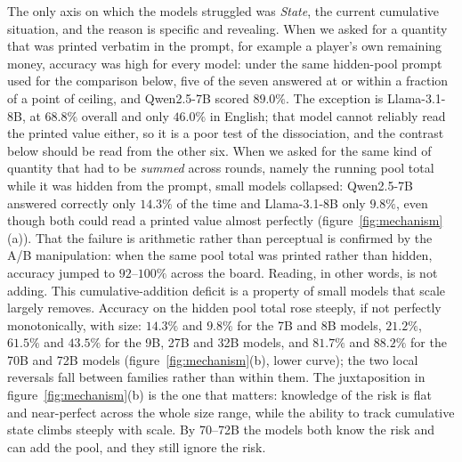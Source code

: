 \documentclass[openacc]{rsproca_new}
\begin{document}
The only axis on which the models struggled was \emph{State}, the current cumulative situation, and the reason is specific and revealing. When we asked for a quantity that was printed verbatim in the prompt, for example a player's own remaining money, accuracy was high for every model: under the same hidden-pool prompt used for the comparison below, five of the seven answered at or within a fraction of a point of ceiling, and Qwen2.5-7B scored $89.0\%$. The exception is Llama-3.1-8B, at $68.8\%$ overall and only $46.0\%$ in English; that model cannot reliably read the printed value either, so it is a poor test of the dissociation, and the contrast below should be read from the other six. When we asked for the same kind of quantity that had to be \emph{summed} across rounds, namely the running pool total while it was hidden from the prompt, small models collapsed: Qwen2.5-7B answered correctly only $14.3\%$ of the time and Llama-3.1-8B only $9.8\%$, even though both could read a printed value almost perfectly (figure~\ref{fig:mechanism}(a)). That the failure is arithmetic rather than perceptual is confirmed by the A/B manipulation: when the same pool total was printed rather than hidden, accuracy jumped to $92$--$100\%$ across the board. Reading, in other words, is not adding. This cumulative-addition deficit is a property of small models that scale largely removes. Accuracy on the hidden pool total rose steeply, if not perfectly monotonically, with size: $14.3\%$ and $9.8\%$ for the 7B and 8B models, $21.2\%$, $61.5\%$ and $43.5\%$ for the 9B, 27B and 32B models, and $81.7\%$ and $88.2\%$ for the 70B and 72B models (figure~\ref{fig:mechanism}(b), lower curve); the two local reversals fall between families rather than within them. The juxtaposition in figure~\ref{fig:mechanism}(b) is the one that matters: knowledge of the risk is flat and near-perfect across the whole size range, while the ability to track cumulative state climbs steeply with scale. By 70--72B the models both know the risk and can add the pool, and they still ignore the risk.
\end{document}

